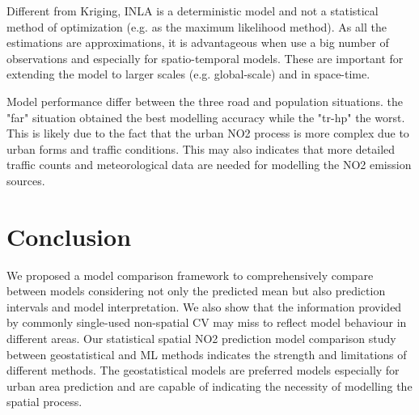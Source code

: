 \documentclass{article}
\begin{document}
Different from Kriging, INLA is a deterministic model and not a statistical method of optimization (e.g. as the maximum likelihood method). As all the estimations are approximations, it is advantageous when use a big number of observations and especially for spatio-temporal models. These are important for extending the model to larger scales (e.g. global-scale) and in space-time. 

Model performance differ between the three road and population situations. the "far" situation obtained the best modelling accuracy while the "tr-hp" the worst. This is likely due to the fact that the urban NO2 process is more complex due to urban forms and traffic conditions. This may also indicates that more detailed traffic counts and meteorological data are needed for modelling the NO2 emission sources.  

\section{Conclusion}
We proposed a model comparison framework to comprehensively compare between models considering not only the predicted mean but also prediction intervals and model interpretation. We also show that the information provided by commonly single-used non-spatial CV may miss to reflect model behaviour in different areas. Our statistical spatial NO2 prediction model comparison study between geostatistical and ML methods indicates the strength and limitations of different methods. The geostatistical models are preferred models especially for urban area prediction and are capable of indicating the necessity of modelling the spatial process. 


\newpage



\end{document}
